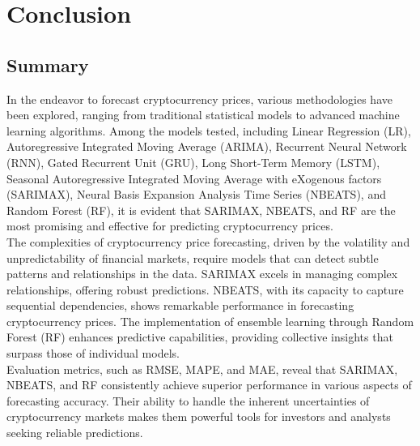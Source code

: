 \documentclass{ieeeojies}
\begin{document}
\section{Conclusion}
\subsection{Summary}
In the endeavor to forecast cryptocurrency prices, various methodologies have been explored, ranging from traditional statistical models to advanced machine learning algorithms. Among the models tested, including Linear Regression (LR), Autoregressive Integrated Moving Average (ARIMA), Recurrent Neural Network (RNN), Gated Recurrent Unit (GRU), Long Short-Term Memory (LSTM), Seasonal Autoregressive Integrated Moving Average with eXogenous factors (SARIMAX), Neural Basis Expansion Analysis Time Series (NBEATS), and Random Forest (RF), it is evident that SARIMAX, NBEATS, and RF are the most promising and effective for predicting cryptocurrency prices.\\
The complexities of cryptocurrency price forecasting, driven by the volatility and unpredictability of financial markets, require models that can detect subtle patterns and relationships in the data. SARIMAX excels in managing complex relationships, offering robust predictions. NBEATS, with its capacity to capture sequential dependencies, shows remarkable performance in forecasting cryptocurrency prices. The implementation of ensemble learning through Random Forest (RF) enhances predictive capabilities, providing collective insights that surpass those of individual models.\\
Evaluation metrics, such as RMSE, MAPE, and MAE, reveal that SARIMAX, NBEATS, and RF consistently achieve superior performance in various aspects of forecasting accuracy. Their ability to handle the inherent uncertainties of cryptocurrency markets makes them powerful tools for investors and analysts seeking reliable predictions.
\end{document}
